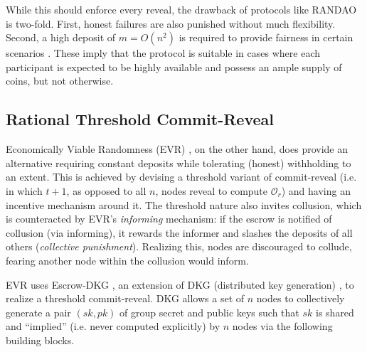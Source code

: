 \documentclass[conference]{IEEEtran}
\theoremstyle{definition}
\theoremstyle{remark}
\begin{document}
While this should enforce every reveal, the drawback of protocols like RANDAO is two-fold. First, honest failures are also punished without much flexibility. Second, a high deposit of $m = O(n^2)$ is required to provide fairness in certain scenarios \cite{andrychowicz2014secure, bentov2014use}. These imply that the protocol is suitable in cases where each participant is expected to be highly available and possess an ample supply of coins, but not otherwise.


\subsection{Rational Threshold Commit-Reveal}
Economically Viable Randomness (EVR) \cite{david2020economically}, on the other hand, does provide an alternative requiring constant deposits while tolerating (honest) withholding to an extent. This is achieved by devising a threshold variant of commit-reveal (i.e. in which $t + 1$, as opposed to all $n$, nodes reveal to compute $\mathcal{O}_r$) and having an incentive mechanism around it. The threshold nature also invites collusion, which is counteracted by EVR's \textit{informing} mechanism: if the escrow is notified of collusion (via informing), it rewards the informer and slashes the deposits of all others (\textit{collective punishment}). Realizing this, nodes are discouraged to collude, fearing another node within the collusion would inform.

EVR uses Escrow-DKG \cite{david2019rational}, an extension of DKG (distributed key generation) \cite{pedersen1991threshold,gennaro1999secure}, to realize a threshold commit-reveal. DKG allows a set of $n$ nodes to collectively generate a pair $(sk, pk)$ of group secret and public keys such that $sk$ is shared and ``implied'' (i.e. never computed explicitly) by $n$ nodes via the following building blocks.
\end{document}

